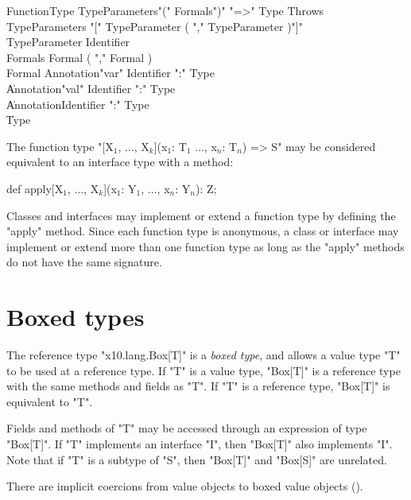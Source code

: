 \begin{grammar}
FunctionType \: TypeParameters\opt \xcd"(" Formals\opt \xcd")"
\xcd"=>" Type Throws\opt \\
TypeParameters \: \xcd"[" TypeParameter ( \xcd"," TypeParameter
)\star \xcd"]" \\
TypeParameter \: Identifier \\
Formals \: Formal ( \xcd"," Formal )\star \\
Formal \: Annotation\star \xcd"var" Identifier \xcd":" Type \\
       \| Annotation\star \xcd"val" Identifier \xcd":" Type \\
       \| Annotation\star Identifier \xcd":" Type \\
       \| Type \\
\end{grammar}

The function type
\xcdmath"[X$_1$, $\dots$, X$_k$](x$_1$: T$_1$ $\dots$, x$_n$: T$_n$) => S"
may be considered equivalent to an interface type
with a method:
\begin{xtenmath}
def apply[X$_1$, $\dots$, X$_k$](x$_1$: Y$_1$, $\dots$, x$_n$: Y$_n$): Z;
\end{xtenmath}
Classes and interfaces may implement or extend a function type
by defining the \xcd"apply" method.  Since each function type is 
anonymous, a class or interface may implement or extend
more than one function type as long as the \xcd"apply" methods
do not have the same signature.

\section{Boxed types}
\label{BoxedTypes}
\label{BoxType}


The reference type \xcd"x10.lang.Box[T]" is a \emph{boxed type},
and allows a value type \xcd"T" to be used at a
reference type.
%
If \xcd"T" is a value type, \xcd"Box[T]" is a reference type
with the same methods and fields as \xcd"T".
If \xcd"T" is a reference type, \xcd"Box[T]" is equivalent to
\xcd"T".

Fields and methods of \xcd"T" may be accessed through an
expression of type \xcd"Box[T]".
If \xcd"T" implements an interface \xcd"I", then
\xcd"Box[T]" also implements \xcd"I". 
Note that if \xcd"T" is a subtype of \xcd"S",
then \xcd"Box[T]" and \xcd"Box[S]" are unrelated.

There are implicit coercions from value objects to boxed value
objects ().

